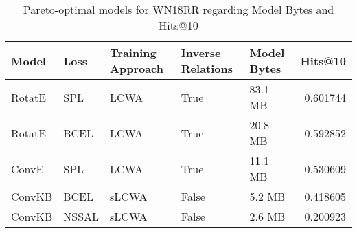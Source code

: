 \begin{table}
\centering
\caption{Pareto-optimal models for WN18RR regarding Model Bytes and Hits@10}
\begin{tabular}{lllllr}
\toprule
  Model &   Loss & Training Approach & Inverse Relations & Model Bytes &   Hits@10 \\
\midrule
 RotatE &    SPL &              LCWA &              True &     83.1 MB &  0.601744 \\
 RotatE &   BCEL &              LCWA &              True &     20.8 MB &  0.592852 \\
  ConvE &    SPL &              LCWA &              True &     11.1 MB &  0.530609 \\
 ConvKB &   BCEL &             sLCWA &             False &      5.2 MB &  0.418605 \\
 ConvKB &  NSSAL &             sLCWA &             False &      2.6 MB &  0.200923 \\
\bottomrule
\end{tabular}
\end{table}


